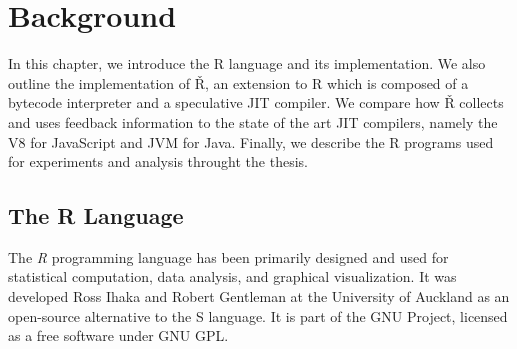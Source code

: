 \chapter{Background}

\begin{chapterabstract}
  In this chapter, we introduce the R language and its implementation. We also outline the implementation of Ř, an extension to R which is composed of a bytecode interpreter and a speculative JIT compiler. We compare how Ř collects and uses feedback information to the state of the art JIT compilers, namely the V8 for JavaScript and JVM for Java. Finally, we describe the R programs used for experiments and analysis throught the thesis.
\end{chapterabstract}

\section{The R Language}

The \textit{R}\cite{r} programming language has been primarily designed and used for statistical computation, data analysis, and graphical visualization. It was developed Ross Ihaka and Robert Gentleman at the University of Auckland as an open-source alternative to the S language. It is part of the GNU Project, licensed as a free software under GNU GPL.


